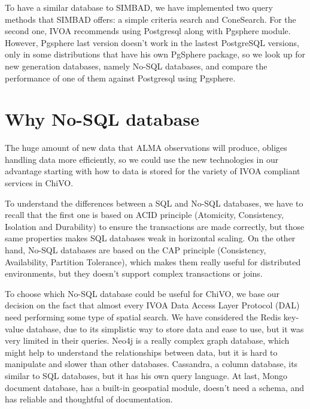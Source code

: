\documentclass[11pt,twoside]{article}
\begin{document}
To have a similar database to SIMBAD, we have implemented two query methods that
SIMBAD offers: a simple criteria search and ConeSearch. For the second one, 
IVOA recommends using Postgresql along with Pgsphere module. 
However, Pgsphere last version doesn't work in the lastest PostgreSQL versions, only in some 
distributions that have his own PgSphere package,
so we look up for new generation databases, namely No-SQL databases, and compare the
performance of one of them against Postgresql using Pgsphere.


\section{Why No-SQL database}
    The huge amount of new data that ALMA observations will produce, obliges
    handling data more efficiently, so we could use the new technologies 
    in our advantage starting with how to data is stored for the variety
    of IVOA compliant services in ChiVO.
    
    To understand the differences between a SQL and No-SQL databases, we have
    to recall that the first one is based on ACID principle 
    (Atomicity, Consistency, Isolation and Durability) to ensure the
    transactions are made correctly, but those same properties
    makes SQL databases weak in horizontal scaling. On the other hand, No-SQL
    databases are based on the CAP principle (Consistency, Availability, Partition
    Tolerance), which makes them really useful for distributed environments, but 
    they doesn't support complex transactions or joins.

    To choose which No-SQL database could be useful for ChiVO, we base our
    decision on the fact that almost every
    IVOA Data Access Layer Protocol (DAL) need performing some type of spatial
    search. We have considered the Redis key-value database, due to its
    simplistic way to store data and ease to use, but it was very limited in
    their queries. Neo4j is a really complex graph database, which might help to
    understand the relationships between data, but it is hard to manipulate and slower 
    than other databases. Cassandra, a column database, its similar
    to SQL databases, but it has his own query language. At last, Mongo document database, 
    has a built-in geospatial module, doesn't need a schema, and has reliable
    and thoughtful of documentation.
\end{document}

